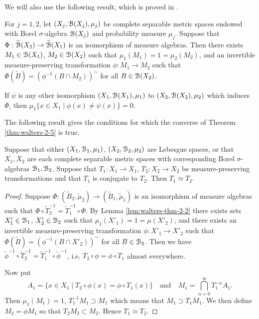 We will also use the following result, which is proved in \cite[Theorem 12]{royden:real-analysis}.

\begin{lemma} \label{lem:walters-thm-2-2}
	For $j = 1, 2$, let $(X_j, \mathcal{B}(X_j), \mu_j)$ be complete separable metric spaces endowed with Borel $\sigma$-algebra $\mathcal{B}(X_j)$ and probability measure $\mu_j$. Suppose that $\Phi: \widetilde{\mathcal{B}}(X_2) \to \widetilde{\mathcal{B}}(X_1)$ is an isomorphism of measure algebras. Then there exists $M_1 \in \mathcal{B}(X_1)$, $M_2 \in \mathcal{B}(X_2)$ such that $\mu_1(M_1) = 1 = \mu_2(M_2)$, and an invertible measure-preserving transformation $\phi: M_1 \to M_2$ such that $\Phi(\tilde{B}) = (\phi^{-1}(B \cap M_2))^\sim$ for all $B \in \mathcal{B}(X_2)$.
	
	If $\psi$ is any other isomorphism $(X_1, \mathcal{B}(X_1), \mu_1)$ to $(X_2, \mathcal{B}(X_2), \mu_2)$ which induces $\Phi$, then $\mu_1\{x \in X_1 \mid \phi(x) \neq \psi(x)\} = 0$.
\end{lemma}

The following result gives the conditions for which the converse of Theorem \ref{thm:walters-2-5} is true.

\begin{theorem} \label{thm:walters-2-6}
	Suppose that either $(X_1, \mathcal{B}_1, \mu_1)$, $(X_2, \mathcal{B}_2, \mu_2)$ are Lebesgue spaces, or that $X_1, X_2$ are each complete separable metric spaces with corresponding Borel $\sigma$-algebras $\mathcal{B}_1, \mathcal{B}_2$. Suppose that $T_1 : X_1 \to X_1$, $T_2 : X_2 \to X_2$ be measure-preserving transformations and that $T_1$ is conjugate to $T_2$. Then $T_1 \simeq T_2$.
	\begin{proof}
		Suppose $\Phi : (\tilde{B}_2, \tilde{\mu}_2) \to (\tilde{B}_1, \tilde{\mu}_1)$ is an isomorphism of measure algebras such that $\Phi \circ \tilde{T}_2^{-1} = \tilde{T}_1^{-1} \circ \Phi$. By Lemma \ref{lem:walters-thm-2-2} there exists sets $X'_1 \in \mathcal{B}_1$, $X'_2 \in \mathcal{B}_2$ such that $\mu_1(X'_1) = 1 = \mu(X'_2)$, and there exists an invertible measure-preserving transformation $\phi : X'_1 \to X'_2$ such that $\Phi(\tilde{B}) = (\phi^{-1}(B \cap X'_2))^\sim$ for all $B \in \mathcal{B}_2$. Then we have $\tilde{\phi}^{-1} \circ \tilde{T}_2^{-1} = \tilde{T}_1^{-1} \circ \tilde{\phi}^{-1}$, i.e. $T_2 \circ \phi = \phi \circ T_1$ almost everywhere.
		
		Now put
		\[
			A_1 = \{x \in X_1 \mid T_2 \circ \phi(x) = \phi \circ T_1(x)\} \quad \text{and} \quad M_1 = \bigcap_{n = 0}^\infty{T_1^{-n}{A_1}}.
		\]
		Then $\mu_1(M_1) = 1$, $T_1^{-1}{M_1} \supset M_1$ which means that $M_1 \supset T_1 M_1$. We then define $M_2 = \phi M_1$ so that $T_2 M_2 \subset M_2$. Hence $T_1 \simeq T_2$.
	\end{proof}
\end{theorem}

